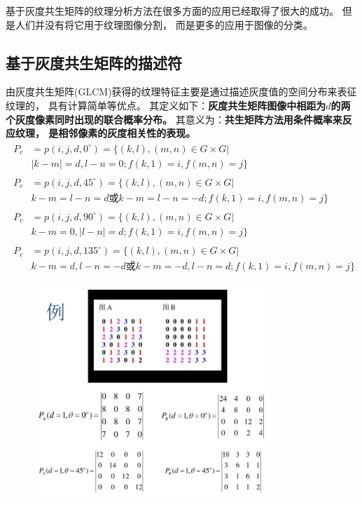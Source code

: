 基于灰度共生矩阵的纹理分析方法在很多方面的应用已经取得了很大的成功。%
但是人们并没有将它用于纹理图像分割，%
而是更多的应用于图像的分类。

\subsection{基于灰度共生矩阵的描述符}
由灰度共生矩阵(GLCM)获得的纹理特征主要是通过描述灰度值的空间分布来表征纹理的，%
具有计算简单等优点。%
其定义如下：\textbf{\color{magenta}灰度共生矩阵\dash 图像中相距为$d$的两个灰度像素同时出现的联合概率分布。}%
其意义为：\textbf{\color{magenta}共生矩阵方法用条件概率来反应纹理，%
  是相邻像素的灰度相关性的表现。}
\begin{gather}
  \begin{split}
    P_{c} &= p(i, j, d, 0^{\circ}) = \{(k, l), (m, n) \in G \times G |\\
    &|k-m|=d, l-n=0; f(k, 1) = i, f(m,n) = j\}
  \end{split}\\
  \begin{split}
    P_{c} &= p(i, j, d, 45^{\circ}) = \{(k, l), (m, n) \in G \times G |\\
    & k-m = l-n = d \text{或} k-m=l-n=-d; f(k, 1) = i, f(m,n) = j\}
  \end{split}\\
  \begin{split}
    P_{c} &= p(i, j, d, 90^{\circ}) = \{(k, l), (m, n) \in G \times G |\\
    & k-m = 0,  |l-n| = d; f(k, 1) = i, f(m,n) = j\}
  \end{split}\\
  \begin{split}
    P_{c} &= p(i, j, d, 135^{\circ}) = \{(k, l), (m, n) \in G \times G |\\
    & k-m = d, l-n = -d \text{或} k-m= -d, l-n=d; f(k, 1) = i, f(m,n) = j\}
  \end{split}
\end{gather}
\begin{figure}[hbpt]
  \centering
  \includegraphics[width=0.8\textwidth]{图像分析的数据结构/Figures/共生矩阵例子}
\end{figure}

